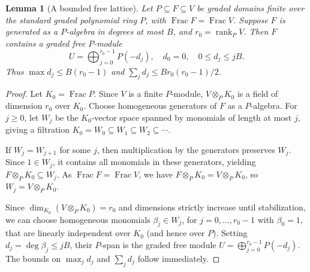 \documentclass[12pt]{amsart}
\numberwithin{equation}{section}
\newtheorem{lemma}[theorem]{Lemma}
\theoremstyle{definition}
\theoremstyle{remark}
\numberwithin{equation}{section}
\begin{document}
\begin{lemma}[A bounded free lattice]
	\label{lem:bounded-field-lattice}
Let $P \subseteq F \subseteq V$ be graded domains finite over the standard graded polynomial ring $P$, with $\operatorname{Frac} F = \operatorname{Frac} V$. Suppose $F$ is  generated as a $P$-algebra in degrees at most $B$, and $r_0 = \operatorname{rank}_P V$. Then $F$ contains a graded free $P$-module
\[
U = \bigoplus_{j=0}^{r_0-1} P(-d_j), \quad d_0 = 0, \quad 0 \le d_j \le jB.
\]
Thus $\max d_j \le B(r_0 - 1)$ and $\sum_j d_j \le Br_0(r_0 - 1)/2$.
\end{lemma}
\begin{proof}
Let $K_0 = \operatorname{Frac} P$. Since $V$ is a finite $P$-module, $V \otimes_P K_0$ is a field of dimension $r_0$ over $K_0$. Choose homogeneous generators of $F$ as a $P$-algebra. For $j \ge 0$, let $W_j$ be the $K_0$-vector space spanned by monomials of length at most $j$, giving a filtration $K_0 = W_0 \subseteq W_1 \subseteq W_2 \subseteq \cdots$.

If $W_j = W_{j+1}$ for some $j$, then multiplication by the generators preserves $W_j$. Since $1 \in W_j$, it contains all monomials in these generators, yielding $F \otimes_P K_0 \subseteq W_j$. As $\operatorname{Frac} F = \operatorname{Frac} V$, we have $F \otimes_P K_0 = V \otimes_P K_0$, so $W_j = V \otimes_P K_0$.

Since $\dim_{K_0}(V \otimes_P K_0) = r_0$ and dimensions strictly increase until stabilization, we can choose homogeneous monomials $\beta_j \in W_j$, for $j=0, \dots, r_0-1$ with $\beta_0 = 1$, that are linearly independent over $K_0$ (and hence over $P$). Setting $d_j = \operatorname{deg} \beta_j \le jB$, their $P$-span is the graded free module $U = \bigoplus_{j=0}^{r_0-1} P(-d_j)$. The bounds on $\max_j d_j$ and $\sum_j d_j$ follow immediately.
\end{proof}
\end{document}
